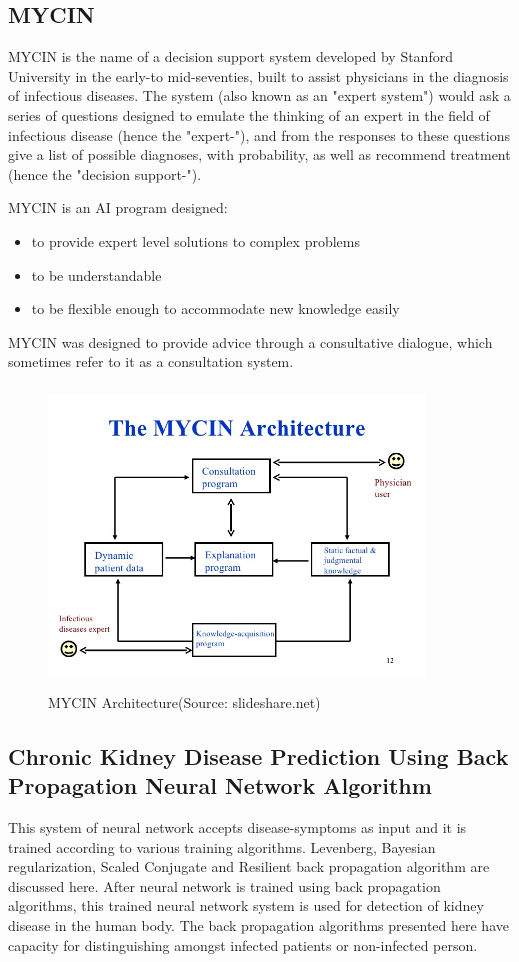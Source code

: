 \subsection{MYCIN}
MYCIN is the name of a decision support system developed by Stanford University in the early-to mid-seventies, built to assist physicians in the diagnosis of infectious diseases. The system (also known as an "expert system") would ask a series of questions designed to emulate the thinking of an expert in the field of infectious disease (hence the "expert-"), and from the responses to these questions give a list of possible diagnoses, with probability, as well as recommend treatment (hence the "decision support-").\par 
MYCIN is an AI program designed:
\begin{itemize}
    \item to provide expert level solutions to complex problems
    \item to be understandable
    \item to be flexible enough to accommodate new knowledge easily
\end{itemize}
MYCIN was designed to provide advice through a consultative dialogue, which sometimes refer to it as a consultation system.

\begin{figure}[H]
\begin{center}
\includegraphics[width=100mm, height = 80mm]{images/mycin.jpg}
\caption{MYCIN Architecture(Source: slideshare.net)}
\end{center}
\end{figure}
\subsection{Chronic Kidney Disease Prediction Using Back Propagation Neural Network Algorithm}
This system of neural network accepts disease-symptoms as input and it is trained according to various training algorithms. Levenberg, Bayesian regularization, Scaled Conjugate and Resilient back propagation algorithm are discussed here. After neural network is trained using back propagation algorithms, this trained neural network system is used for detection of kidney disease in the human body. The back propagation algorithms presented here have capacity for distinguishing amongst infected patients or non-infected person.
